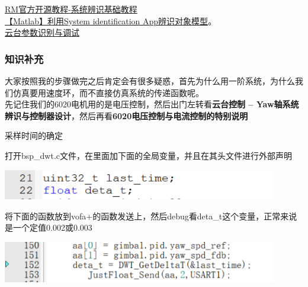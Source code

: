 \documentclass[UTF8,a4paper,12pt]{ctexart}
\begin{document}
    \href{https://bbs.robomaster.com/wiki/4574/3559}{RM官方开源教程-系统辨识基础教程}
    \\\href{ https://blog.csdn.net/xiaohejiaoyiya/article/details/105958551?ops_request_misc=%257B%2522request%255Fid%2522%253A%2522d515a96088d8f99093ec8d0b4cb80d62%2522%252C%2522scm%2522%253A%252220140713.130102334.pc%255Fall.%2522%257D&request_id=d515a96088d8f99093ec8d0b4cb80d62&biz_id=0&utm_medium=distribute.pc_search_result.none-task-blog-2~all~first_rank_ecpm_v1~rank_v31_ecpm-1-105958551-null-null.142^v100^pc_search_result_base1&utm_term=%E5%88%A9%E7%94%A8system%20identification%E7%A1%AE%E8%AE%A4%E6%A8%A1%E5%9E%8B&spm=1018.2226.3001.4187}{【Matlab】利用System identification App辨识对象模型}。\\
     \href{https://www.bilibili.com/video/BV1wX7BzVEf6/?spm_id_from=333.1391.0.0&vd_source=b02f21f21dd17ebeef8dac9338c9d06c}{云台参数识别与调试}    
    \subsubsection{知识补充}
    \begin{flushleft}
      大家按照我的步骤做完之后肯定会有很多疑惑，首先为什么用一阶系统，为什么我们仿真要用速度环，而不直接仿真系统的传递函数呢。
      \\先记住我们的6020电机用的是电压控制，然后出门左转看\textbf{云台控制 -- Yaw轴系统辨识与控制器设计}，然后再看\textbf{6020电压控制与电流控制的特别说明}
    \end{flushleft}
    \begin{titlebox}{采样时间的确定}
      \begin{flushleft}
         打开bsp\_dwt.c文件，在里面加下面的全局变量，并且在其头文件进行外部声明
      \end{flushleft}
      \par \includegraphics[width=12cm]{picture/variable.png}
      \\
      \begin{flushleft}
        将下面的函数放到vofa+的函数发送上，然后debug看deta\_t这个变量，正常来说是一个定值0.002或0.003
        \par \includegraphics[width=12cm]{picture/variable_1.png}
      \end{flushleft}
    \end{titlebox}
    
\end{document}

